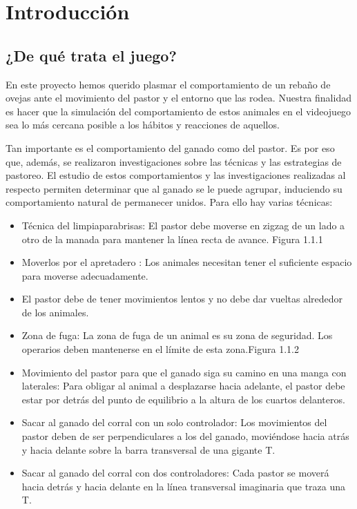 \section{Introducción}
\label{sec:introduccion}

\subsection{¿De qué trata el juego?}
\label{subsubsection:intro_juego}

En este proyecto hemos querido plasmar el comportamiento de un rebaño de ovejas ante el movimiento del pastor y el entorno que las rodea. 
Nuestra finalidad es hacer que la simulación del comportamiento de estos animales en el videojuego sea lo más cercana posible a los hábitos 
y reacciones de aquellos. 

Tan importante es el comportamiento del ganado como del pastor. Es por eso que, además, se realizaron investigaciones sobre las técnicas y 
las estrategias de pastoreo. El estudio de estos comportamientos y las investigaciones realizadas al respecto permiten determinar que al 
ganado se le puede agrupar, induciendo su comportamiento natural de permanecer unidos. Para ello hay varias técnicas:

\begin{itemize}
 \item Técnica del limpiaparabrisas: El pastor debe moverse en zigzag de un lado a otro de la manada para mantener la línea recta de avance. Figura 1.1.1

 \item Moverlos por el apretadero : Los animales necesitan tener el suficiente espacio para moverse adecuadamente.

 \item El pastor debe de tener movimientos lentos y no debe dar vueltas alrededor de los animales.

 \item Zona de fuga: La zona de fuga de un animal es su zona de seguridad. Los operarios deben mantenerse en el límite de esta zona.Figura 1.1.2

 \item Movimiento del pastor para que el ganado siga su camino en una manga con laterales: Para obligar al animal a desplazarse hacia adelante, el pastor debe estar por detrás del punto de equilibrio a la altura de los cuartos delanteros.

 \item Sacar al ganado del corral con un solo controlador: Los movimientos del pastor deben de ser perpendiculares a los del ganado, moviéndose hacia atrás y hacia delante sobre la barra transversal de una gigante T.

 \item Sacar al ganado del corral con dos controladores:  Cada pastor se moverá hacia detrás y hacia delante en la línea transversal imaginaria que traza una T.
\end{itemize}

